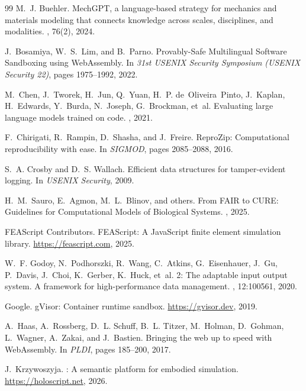 \documentclass[letterpaper,twocolumn,10pt]{article}
\begin{document}
\begin{thebibliography}{99}
M.~J. Buehler.
\newblock MechGPT, a language-based strategy for mechanics and
  materials modeling that connects knowledge across scales, disciplines,
  and modalities.
, 76(2), 2024.

J.~Bosamiya, W.~S.~Lim, and B.~Parno.
\newblock Provably-Safe Multilingual Software Sandboxing using
  {WebAssembly}.
\newblock In {\em 31st USENIX Security Symposium (USENIX Security 22)},
  pages 1975--1992, 2022.

M.~Chen, J.~Tworek, H.~Jun, Q.~Yuan, H.~P. de~Oliveira~Pinto,
J.~Kaplan, H.~Edwards, Y.~Burda, N.~Joseph, G.~Brockman, et~al.
\newblock Evaluating large language models trained on code.
, 2021.

F.~Chirigati, R.~Rampin, D.~Shasha, and J.~Freire.
\newblock ReproZip: Computational reproducibility with ease.
\newblock In {\em SIGMOD}, pages 2085--2088, 2016.

S.~A. Crosby and D.~S. Wallach.
\newblock Efficient data structures for tamper-evident logging.
\newblock In {\em USENIX Security}, 2009.

H.~M.~Sauro, E.~Agmon, M.~L.~Blinov, and others.
\newblock From {FAIR} to {CURE}: Guidelines for Computational Models of
  Biological Systems.
, 2025.

FEAScript Contributors.
\newblock FEAScript: A JavaScript finite element simulation library.
\newblock \url{https://feascript.com}, 2025.

W.~F. Godoy, N.~Podhorszki, R.~Wang, C.~Atkins, G.~Eisenhauer,
J.~Gu, P.~Davis, J.~Choi, K.~Gerber, K.~Huck, et~al.
 2: The adaptable input output system. A framework
  for high-performance data management.
, 12:100561, 2020.

Google.
\newblock gVisor: Container runtime sandbox.
\newblock \url{https://gvisor.dev}, 2019.

A.~Haas, A.~Rossberg, D.~L. Schuff, B.~L. Titzer, M.~Holman,
D.~Gohman, L.~Wagner, A.~Zakai, and J.~Bastien.
\newblock Bringing the web up to speed with {WebAssembly}.
\newblock In {\em PLDI}, pages 185--200, 2017.

J.~Krzywoszyja.
: A semantic platform for embodied simulation.
\newblock \url{https://holoscript.net}, 2026.


\end{thebibliography}
\end{document}
